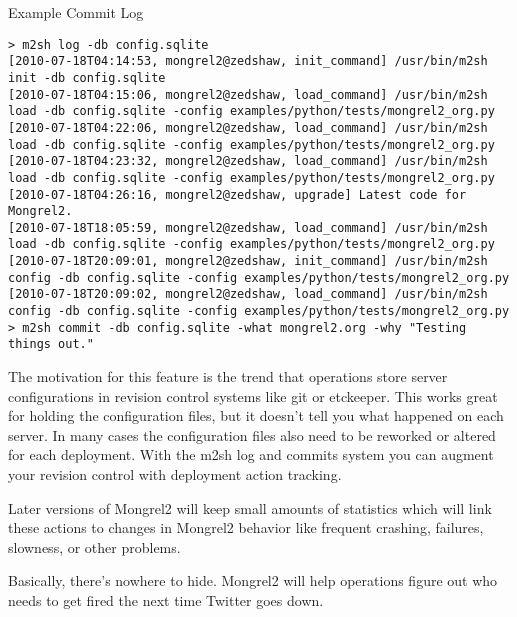 \begin{code}{Example Commit Log}
\begin{verbatim}
> m2sh log -db config.sqlite 
[2010-07-18T04:14:53, mongrel2@zedshaw, init_command] /usr/bin/m2sh init -db config.sqlite
[2010-07-18T04:15:06, mongrel2@zedshaw, load_command] /usr/bin/m2sh load -db config.sqlite -config examples/python/tests/mongrel2_org.py
[2010-07-18T04:22:06, mongrel2@zedshaw, load_command] /usr/bin/m2sh load -db config.sqlite -config examples/python/tests/mongrel2_org.py
[2010-07-18T04:23:32, mongrel2@zedshaw, load_command] /usr/bin/m2sh load -db config.sqlite -config examples/python/tests/mongrel2_org.py
[2010-07-18T04:26:16, mongrel2@zedshaw, upgrade] Latest code for Mongrel2.
[2010-07-18T18:05:59, mongrel2@zedshaw, load_command] /usr/bin/m2sh load -db config.sqlite -config examples/python/tests/mongrel2_org.py
[2010-07-18T20:09:01, mongrel2@zedshaw, init_command] /usr/bin/m2sh config -db config.sqlite -config examples/python/tests/mongrel2_org.py
[2010-07-18T20:09:02, mongrel2@zedshaw, load_command] /usr/bin/m2sh config -db config.sqlite -config examples/python/tests/mongrel2_org.py
> m2sh commit -db config.sqlite -what mongrel2.org -why "Testing things out."
\end{verbatim}
\end{code}

The motivation for this feature is the trend that operations store server configurations
in revision control systems like git or etckeeper.  This works great for holding the configuration
files, but it doesn't tell you what happened on each server.  In many cases the configuration
files also need to be reworked or altered for each deployment.  With the m2sh log and commits
system you can augment your revision control with deployment action tracking.

Later versions of Mongrel2 will keep small amounts of statistics which will link these actions
to changes in Mongrel2 behavior like frequent crashing, failures, slowness, or other problems.

Basically, there's nowhere to hide.  Mongrel2 will help operations figure out who needs to
get fired the next time Twitter goes down.

